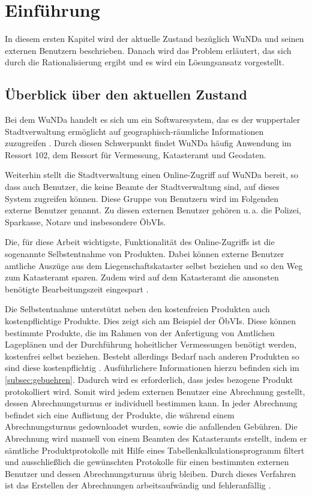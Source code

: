\chapter{Einführung}
In diesem ersten Kapitel wird der aktuelle Zustand bezüglich \acs{WuNDa} und seinen externen Benutzern beschrieben. Danach wird das Problem erläutert, das sich durch die Rationalisierung ergibt und es wird ein Lösungsansatz vorgestellt.

\section{Überblick über den aktuellen Zustand}
Bei dem \ac{WuNDa} handelt es sich um ein Softwaresystem, das es der wuppertaler Stadtverwaltung ermöglicht auf geographisch-räumliche Informationen zuzugreifen \autocite[vgl.][]{cismet-wunda}. Durch diesen Schwerpunkt findet \ac{WuNDa} häufig Anwendung im Ressort 102, dem Ressort für Vermessung, Katasteramt und Geodaten.

Weiterhin stellt die Stadtverwaltung einen Online-Zugriff auf \ac{WuNDa} bereit, so dass auch Benutzer, die keine Beamte der Stadtverwaltung sind, auf dieses System zugreifen können. Diese Gruppe von Benutzern wird im Folgenden externe Benutzer genannt.
Zu diesen externen Benutzer gehören u.\,a. die Polizei, Sparkasse, Notare und insbesondere \acp{ÖbVI}.

Die, für diese Arbeit wichtigste, Funktionalität des Online-Zugriffs ist die sogenannte Selbstentnahme von Produkten. Dabei können externe Benutzer amtliche Auszüge aus dem Liegenschaftskataster selbst beziehen und so den Weg zum Katasteramt sparen. Zudem wird auf dem Katasteramt die ansonsten benötigte Bearbeitungszeit eingespart \autocite[vgl.][]{wupp-wunda}.

Die Selbstentnahme unterstützt neben den kostenfreien Produkten auch kostenpflichtige Produkte. 
Dies zeigt sich am Beispiel der \acp{ÖbVI}. Diese können bestimmte Produkte, die im Rahmen von der Anfertigung von Amtlichen Lageplänen und der Durchführung hoheitlicher Vermessungen benötigt werden, kostenfrei selbst beziehen.
Besteht allerdings Bedarf nach anderen Produkten so sind diese kostenpflichtig \autocite[vgl.][]{wupp-wunda-oebvi}. Ausführlichere Informationen hierzu befinden sich im \autoref{subsec:gebuehren}.
Dadurch wird es erforderlich, dass jedes bezogene Produkt protokolliert wird.
Somit wird jedem externen Benutzer eine Abrechnung gestellt, dessen Abrechnungsturnus er individuell bestimmen kann.
In jeder Abrechnung befindet sich eine Auflistung der Produkte, die während einem Abrechnungsturnus gedownloadet wurden, sowie die anfallenden Gebühren.
Die Abrechnung wird manuell von einem Beamten des Katasteramts erstellt, indem er sämtliche Produktprotokolle mit Hilfe eines Tabellenkalkulationsprogramm filtert und ausschließlich die gewünschten Protokolle für einen bestimmten externen Benutzer und dessen Abrechnungsturnus übrig bleiben.
Durch dieses Verfahren ist das Erstellen der Abrechnungen arbeitsaufwändig und fehleranfällig \autocite[vgl.][]{sander-abrechnung}.


